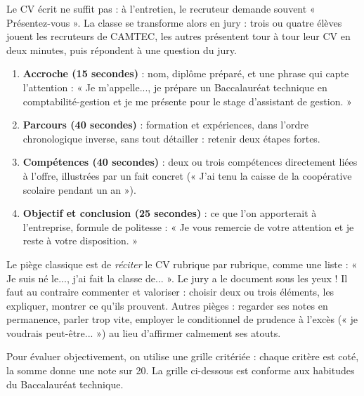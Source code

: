 \documentclass[11pt]{article}
\newcommand{\cle}[1]{{\popxbold\color{popdark}#1}}
\newcounter{popsec}
\newcounter{popsub}
\newcommand{\courssub}[1]{%
  \stepcounter{popsub}%
  \par\vspace{9pt}\noindent{\popxbold\fontsize{11.5}{13}\selectfont\color{popink}{\color{poporange}\thepopsec.\thepopsub}\hspace{6pt}#1}\par\nopagebreak\vspace{4pt}
}
\begin{document}
Le CV écrit ne suffit pas : à l'entretien, le recruteur demande souvent « Présentez-vous ». La classe se transforme alors en jury : trois ou quatre élèves jouent les recruteurs de CAMTEC, les autres présentent tour à tour leur CV en deux minutes, puis répondent à une question du jury.

\begin{methode}
\begin{enumerate}
\item \textbf{Accroche (15 secondes)} : nom, diplôme préparé, et une phrase qui capte l'attention : « Je m'appelle..., je prépare un Baccalauréat technique en comptabilité-gestion et je me présente pour le stage d'assistant de gestion. »
\item \textbf{Parcours (40 secondes)} : formation et expériences, dans l'ordre chronologique inverse, sans tout détailler : retenir deux étapes fortes.
\item \textbf{Compétences (40 secondes)} : deux ou trois compétences directement liées à l'offre, illustrées par un fait concret (« J'ai tenu la caisse de la coopérative scolaire pendant un an »).
\item \textbf{Objectif et conclusion (25 secondes)} : ce que l'on apporterait à l'entreprise, formule de politesse : « Je vous remercie de votre attention et je reste à votre disposition. »
\end{enumerate}
\end{methode}

\begin{attention}
Le piège classique est de \emph{réciter} le CV rubrique par rubrique, comme une liste : « Je suis né le..., j'ai fait la classe de... ». Le jury a le document sous les yeux ! Il faut au contraire \cle{commenter} et \cle{valoriser} : choisir deux ou trois éléments, les expliquer, montrer ce qu'ils prouvent. Autres pièges : regarder ses notes en permanence, parler trop vite, employer le conditionnel de prudence à l'excès (« je voudrais peut-être... ») au lieu d'affirmer calmement ses atouts.
\end{attention}

\courssub{Grille d'évaluation critériée}

Pour évaluer objectivement, on utilise une \cle{grille critériée} : chaque critère est coté, la somme donne une note sur 20. La grille ci-dessous est conforme aux habitudes du Baccalauréat technique.
\end{document}
